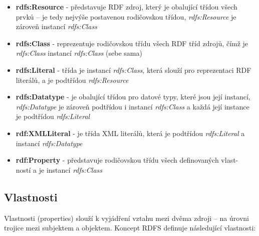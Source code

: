 \documentclass{projekt}
\begin{document}
\begin {itemize}

\item \textbf{rdfs:Resource} - představuje RDF zdroj, který je obalující třídou všech prvků – je tedy nejvýše postavenou rodičovskou třídou, {\it rdfs:Resource} je zároveň instancí {\it rdfs:Class}
\item \textbf{rdfs:Class} - reprezentuje rodičovskou třídu všech RDF tříd zdrojů, čímž je {\it rdfs:Class} instancí {\it rdfs:Class} (sebe sama)
\item \textbf{rdfs:Literal} - třída je instancí {\it rdfs:Class}, která slouží pro reprezentaci RDF literálů, a je podtřídou {\it rdfs:Resource}
\item \textbf{rdfs:Datatype} - je obalující třídou pro datové typy, které jsou její instancí, {\it rdfs:Datatype} je zároveň podtřídou i instancí {\it rdfs:Class} a každá její instance je podtřídou {\it rdfs:Literal}
\item \textbf{rdf:XMLLiteral} - je třída XML literálů, která je podtřídou {\it rdfs:Literal} a instancí {\it rdfs:Datatype}
\item \textbf{rdf:Property} - představuje rodičovskou třídu všech definovaných vlast-\\ností a je instancí {\it rdfs:Class}


\end{itemize}


\subsection{Vlastnosti}
\hspace{0.65cm}Vlastnosti (properties) slouží k vyjádření vztahu mezi dvěma zdroji – na úrovni trojice mezi subjektem a objektem. Koncept RDFS definuje následující vlastnosti:
\end{document}
